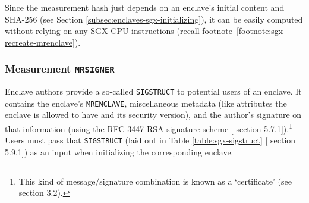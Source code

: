 Since the measurement hash just depends on an enclave's initial content and SHA-256 (see Section \ref{subsec:enclaves-sgx-initializing}), it can be easily computed without relying on any SGX CPU instructions (recall footnote~\ref{footnote:sgx-recreate-mrenclave}).

\subsubsection{Measurement {\tt MRSIGNER}}

Enclave authors provide a so-called {\tt SIGSTRUCT} to potential users of an enclave. It contains the enclave's {\tt MRENCLAVE}, miscellaneous metadata (like attributes the enclave is allowed to have and its security version), and the author's signature on that information (using the RFC 3447 \cite{RSA-sig-RFC-3447} RSA signature scheme [\cite{intel-sgx-explained-advanced} section 5.7.1]).\footnote{This kind of message/signature combination is known as a `certificate' (see \cite{intel-sgx-explained-advanced} section 3.2).} Users must pass that {\tt SIGSTRUCT} (laid out in Table \ref{table:sgx-sigstruct} [\cite{intel-sgx-explained-advanced} section 5.9.1]) as an input when initializing the corresponding enclave.

